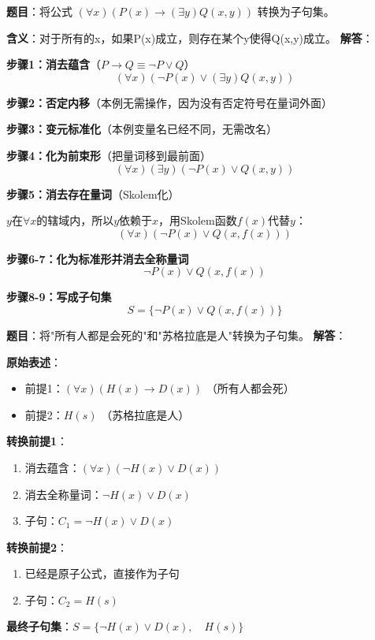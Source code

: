 \begin{examplebox}
\textbf{题目}：将公式 $(\forall x)(P(x) \to (\exists y)Q(x,y))$ 转换为子句集。

\textbf{含义}：对于所有的x，如果P(x)成立，则存在某个y使得Q(x,y)成立。
\tcblower
\textbf{解答}：

\textbf{步骤1：消去蕴含}（$P \to Q \equiv \neg P \lor Q$）
$$(\forall x)(\neg P(x) \lor (\exists y)Q(x,y))$$

\textbf{步骤2：否定内移}（本例无需操作，因为没有否定符号在量词外面）

\textbf{步骤3：变元标准化}（本例变量名已经不同，无需改名）

\textbf{步骤4：化为前束形}（把量词移到最前面）
$$(\forall x)(\exists y)(\neg P(x) \lor Q(x,y))$$

\textbf{步骤5：消去存在量词}（Skolem化）

$y$在$\forall x$的辖域内，所以$y$依赖于$x$，用Skolem函数$f(x)$代替$y$：
$$(\forall x)(\neg P(x) \lor Q(x,f(x)))$$

\textbf{步骤6-7：化为标准形并消去全称量词}
$$\neg P(x) \lor Q(x,f(x))$$

\textbf{步骤8-9：写成子句集}
$$S = \{\neg P(x) \lor Q(x,f(x))\}$$
\end{examplebox}

\begin{examplebox}
\textbf{题目}：将"所有人都是会死的"和"苏格拉底是人"转换为子句集。
\tcblower
\textbf{解答}：

\textbf{原始表述}：
\begin{itemize}[itemsep=0pt]
    \item 前提1：$(\forall x)(H(x) \to D(x))$ （所有人都会死）
    \item 前提2：$H(s)$ （苏格拉底是人）
\end{itemize}

\textbf{转换前提1}：
\begin{enumerate}[itemsep=0pt]
    \item 消去蕴含：$(\forall x)(\neg H(x) \lor D(x))$
    \item 消去全称量词：$\neg H(x) \lor D(x)$
    \item 子句：$C_1 = \neg H(x) \lor D(x)$
\end{enumerate}

\textbf{转换前提2}：
\begin{enumerate}[itemsep=0pt]
    \item 已经是原子公式，直接作为子句
    \item 子句：$C_2 = H(s)$
\end{enumerate}

\textbf{最终子句集}：$S = \{\neg H(x) \lor D(x), \quad H(s)\}$
\end{examplebox}

